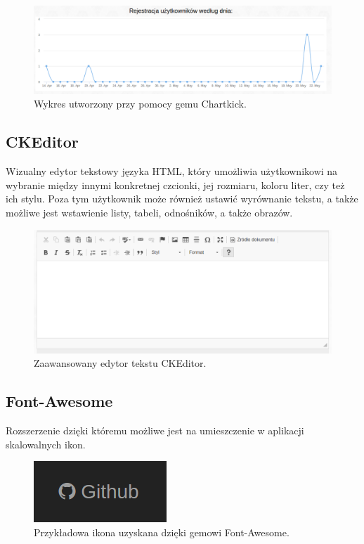 \documentclass[brudnopis]{xmgr}
\begin{document}
\begin{figure}[!tbh]
\centering
\includegraphics[width=\linewidth]{fig/chart}
\caption{Wykres utworzony przy pomocy gemu Chartkick.}
\end{figure}

\subsection{CKEditor} 

Wizualny edytor tekstowy języka HTML, który umożliwia użytkownikowi na wybranie między innymi konkretnej 
czcionki, jej rozmiaru, koloru liter, czy też ich stylu. Poza tym użytkownik może również ustawić wyrównanie tekstu,
a także możliwe jest wstawienie listy, tabeli, odnośników, a także obrazów.

\begin{figure}[!tbh]
\centering
\includegraphics[width=\linewidth]{fig/ckeditor}
\caption{Zaawansowany edytor tekstu CKEditor.}
\end{figure}

\subsection{Font-Awesome}

Rozszerzenie dzięki któremu możliwe jest na umieszczenie w aplikacji skalowalnych ikon.

\begin{figure}[!tbh]
\centering
\includegraphics[scale=0.5]{fig/icon}
\caption{Przykładowa ikona uzyskana dzięki gemowi Font-Awesome.}
\end{figure}
\end{document}
